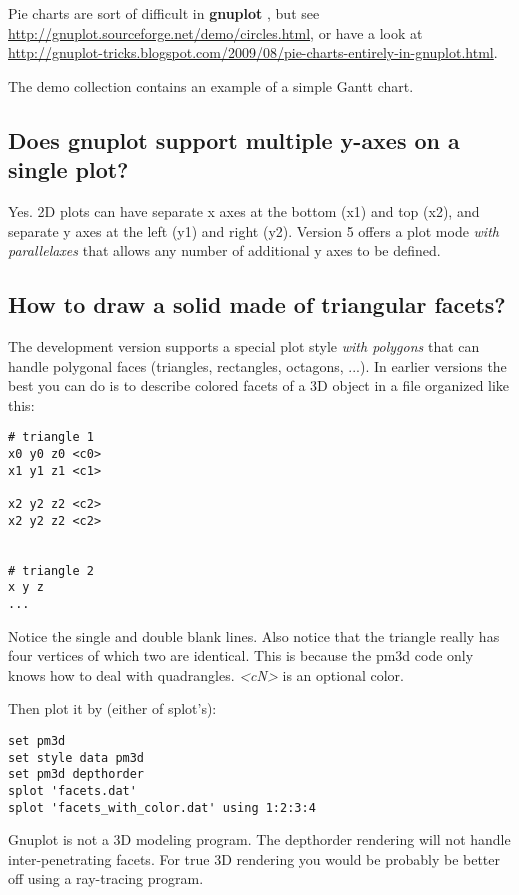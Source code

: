 \documentclass[a4paper,11pt]{article}
\def\http#1{{\small\href{http://#1}{\url{http://#1}}}}
\newcommand{\http}[1]%
            {\htmladdnormallink{\latex{\url{http://#1}}%
                    \html{\textit{http://#1}}}%
                {http://#1}%
            }
\newcommand{\gnuplot}{\textbf{gnuplot }}
\begin{document}
Pie charts are sort of difficult in \gnuplot, but see
\http{gnuplot.sourceforge.net/demo/circles.html},
or have a look at
\http{gnuplot-tricks.blogspot.com/2009/08/pie-charts-entirely-in-gnuplot.html}.

The demo collection contains an example of a simple Gantt chart.

\subsection{Does \gnuplot support multiple y-axes on a single plot?}

Yes. 2D plots can have separate x axes at the bottom (x1) and top (x2),
and separate y axes at the left (y1) and right (y2).  Version 5 offers a
plot mode \textit{with parallelaxes} that allows any number of additional
y axes to be defined.

\subsection{How to draw a solid made of triangular facets?}

The development version supports a special plot style \textit{with polygons}
that can handle polygonal faces (triangles, rectangles, octagons, ...).
In earlier versions the best you can do is to describe colored facets of a
3D object in a file organized like this:
\small
\begin{verbatim}
# triangle 1
x0 y0 z0 <c0>
x1 y1 z1 <c1>

x2 y2 z2 <c2>
x2 y2 z2 <c2>


# triangle 2
x y z
...
\end{verbatim}
\normalsize

Notice the single and double blank lines. Also notice that the triangle
really has four vertices of which two are identical.  This is because the
pm3d code only knows how to deal with quadrangles.
\textit{<cN>} is an optional color.

Then plot it by (either of splot's):
\small
\begin{verbatim}
set pm3d
set style data pm3d
set pm3d depthorder
splot 'facets.dat'
splot 'facets_with_color.dat' using 1:2:3:4
\end{verbatim}
\normalsize

Gnuplot is not a 3D modeling program.
The depthorder rendering will not handle inter-penetrating facets.
For true 3D rendering you would be probably be better off using a ray-tracing program.
\end{document}
